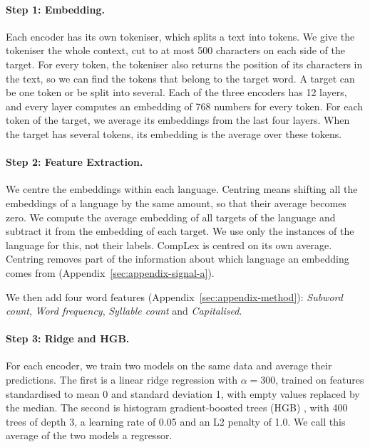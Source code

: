 \documentclass[11pt]{article}
\begin{document}
\paragraph{Step 1: Embedding.} Each encoder has its own tokeniser, which splits a text into tokens. %
We give the tokeniser the whole context, cut to at most 500 characters on each side %
of the target. For every token, the tokeniser also returns the position of its characters in the %
text, so we can find the tokens that belong to the target word. A target can be one token or be
split into several. Each of the three encoders has 12 layers, and every layer computes an embedding %
of 768 numbers for every token. For each token of the target, we average its embeddings from the
last four layers. When the target has several tokens, its embedding is the average over these %
tokens.

\paragraph{Step 2: Feature Extraction.} We centre the embeddings within each language. Centring
means shifting all the embeddings of a language by the same amount, so that their average becomes
zero. We compute the average embedding of all targets of the language and subtract it from the %
embedding of each target. We use only the instances of the language for this, not their labels.
CompLex is centred on its own average. Centring removes part of the information about which %
language an embedding comes from (Appendix~\ref{sec:appendix-signal-a}).

We then add four word features (Appendix~\ref{sec:appendix-method}): \emph{Subword count}, \emph{Word
frequency}, \emph{Syllable count} and \emph{Capitalised}.

\paragraph{Step 3: Ridge and HGB.} For each encoder, we train two models on the same data and %
average their predictions. The first is a linear ridge regression with $\alpha = 300$, trained on
features standardised to mean 0 and standard deviation 1, with empty values replaced by the median. %
The second is histogram gradient-boosted trees (HGB) \citep{pedregosa-etal-2011-scikit}, with 400 trees of depth 3, a learning rate of %
0.05 and an L2 penalty of 1.0. We call this average of the two models a regressor.
\end{document}
